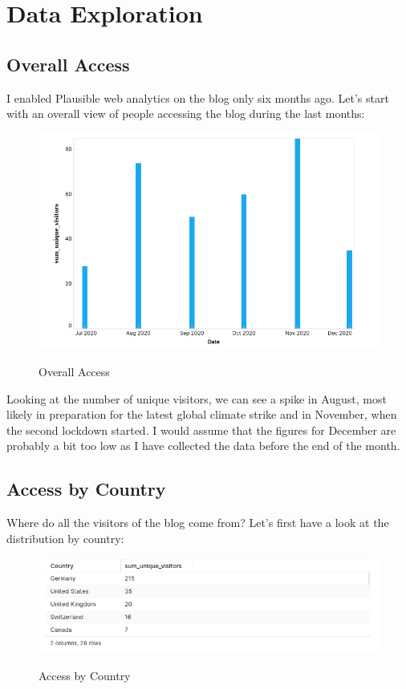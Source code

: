 %
%

\pagebreak
\section{Data Exploration}

\onehalfspacing

\subsection{Overall Access}

I enabled Plausible web analytics on the blog only six months ago. Let's start with an overall view of people accessing the blog during the last months:

\begin{figure}[H]
\centering
\caption {Overall Access}
\includegraphics[width=\linewidth]{images/access-overall.png}
\label{fig:accessOverall}
\end{figure}

Looking at the number of unique visitors, we can see a spike in August, most likely in preparation for the latest global climate strike and in November, when the second lockdown started. I would assume that the figures for December are probably a bit too low as I have collected the data before the end of the month.

\subsection{Access by Country}

Where do all the visitors of the blog come from? Let's first have a look at the distribution by country:

\begin{figure}[H]
\centering
\caption {Access by Country}
\includegraphics[width=\linewidth]{images/access-country.png}
\label{fig:accessCountry}
\end{figure}

